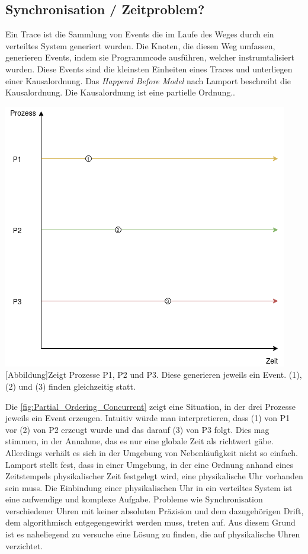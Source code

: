 	
\subsection{Synchronisation / Zeitproblem?} 
\label{subsection:Synchronisation}
Ein Trace ist die Sammlung von Events die im Laufe des Weges durch ein verteiltes System generiert wurden. Die Knoten, die diesen Weg umfassen, generieren Events, indem sie Programmcode ausführen, welcher instrumtalisiert wurden. Diese Events sind die kleinsten Einheiten eines Traces und unterliegen einer Kausalordnung. Das \emph{Happend Before Model} nach Lamport beschreibt die Kausalordnung. Die Kausalordnung ist eine partielle Ordnung.. 

\begin{minipage}[c]{\textwidth}
	\centering
	\includegraphics[scale=0.5]{img/synchronisation/PartialOrdering_Concurrent.png}
	[Abbildung]{Zeigt Prozesse P1, P2 und P3. Diese generieren jeweils ein Event. (1), (2) und (3) finden gleichzeitig statt.}
	\label{fig:Partial_Ordering_Concurrent}
\end{minipage} 

Die \cref{fig:Partial_Ordering_Concurrent} zeigt eine Situation, in der drei Prozesse jeweils ein Event erzeugen. Intuitiv würde man interpretieren, dass (1) von P1 vor (2) von P2 erzeugt wurde und das darauf (3) von P3 folgt. Dies mag stimmen, in der Annahme, das es nur eine globale Zeit als richtwert gäbe. Allerdings verhält es sich in der Umgebung von Nebenläufigkeit nicht so einfach. Lamport stellt fest, dass in einer Umgebung, in der eine Ordnung anhand eines Zeitstempels physikalischer Zeit festgelegt wird, eine physikalische Uhr vorhanden sein muss. Die Einbindung einer physikalischen Uhr in ein verteiltes System ist eine aufwendige und komplexe Aufgabe. Probleme wie Synchronisation verschiedener Uhren mit keiner absoluten Präzision und dem dazugehörigen Drift, dem algorithmisch entgegengewirkt werden muss, treten auf.  Aus diesem Grund ist es naheliegend zu versuche eine Lösung zu finden, die auf physikalische Uhren verzichtet.

